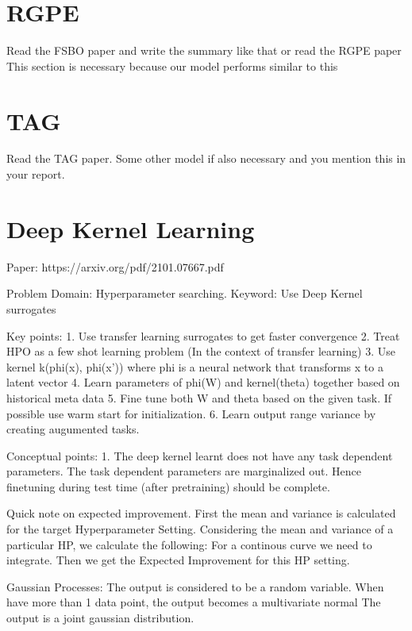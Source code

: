 \documentclass[11pt]{report}
\begin{document}
\section{RGPE}
Read the FSBO paper and write the summary like that or read  the RGPE paper
This section is necessary because our model performs similar to this

\section{TAG}
Read the TAG paper.
Some other model if also necessary and you mention this in your report.

\section{Deep Kernel Learning}

Paper: https://arxiv.org/pdf/2101.07667.pdf

Problem Domain: Hyperparameter searching.
Keyword: Use Deep Kernel surrogates

Key points:
    1. Use transfer learning surrogates to get faster convergence
    2. Treat HPO as a few shot learning problem (In the context of transfer learning)
    3. Use kernel k(phi(x), phi(x')) where phi is a neural network that transforms x to a latent vector
    4. Learn parameters of phi(W) and kernel(theta) together based on historical meta data
    5. Fine tune both W and theta based on the given task. If possible use warm start for initialization.
    6. Learn output range variance by creating augumented tasks.

Conceptual points:
    1. The deep kernel learnt does not have any task dependent parameters.
       The task dependent parameters are marginalized out.
       Hence finetuning during test time (after pretraining) should be complete.

Quick note on expected improvement.
    First the mean and variance is calculated for the target Hyperparameter Setting.
    Considering the mean and variance of a particular HP, we calculate the following:
        For a continous curve we need to integrate.
    Then we get the Expected Improvement for this HP setting.


Gaussian Processes:
    The output is considered to be a random variable.
    When have more than 1 data point, the output becomes a multivariate normal
        The output is a joint gaussian distribution.
\end{document}
